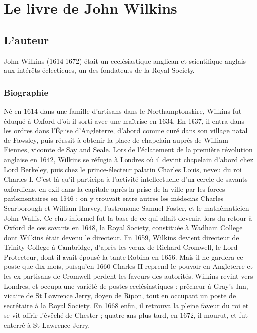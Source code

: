 \chapter{Le livre de John Wilkins}\label{Wilkins}
\section{L'auteur}\label{WilkinsAut}
John Wilkins (1614-1672) était un ecclésiastique anglican et scientifique anglais aux intérêts éclectiques, un des fondateurs de la Royal Society.
\subsection{Biographie}
Né en 1614 dans une famille d'artisans dans le Northamptonshire, Wilkins fut éduqué à Oxford d'où il sorti avec une maîtrise en 1634.
En 1637, il entra dans les ordres dans l'Église d'Angleterre, d'abord comme curé dans son village natal de Fawsley, puis réussit à obtenir la place de chapelain auprès de William Fiennes, vicomte de Say and Seale.
Lors de l'éclatement de la première révolution anglaise en 1642, Wilkins se réfugia à Londres où il devint chapelain d'abord chez Lord Berkeley, puis chez le prince-électeur palatin Charles Louis, neveu du roi Charles I\ier.
C'est là qu'il participa à l'activité intellectuelle d'un cercle de savants oxfordiens, en exil dans la capitale après la prise de la ville par les forces parlementaires en 1646 ; on y trouvait entre autres les médecins Charles Scarborough et William Harvey, l'astronome Samuel Foster, et le mathématicien John Wallis.
Ce club informel fut la base de ce qui allait devenir, lors du retour à Oxford de ces savants en 1648, la Royal Society, constituée à Wadham College dont Wilkins était devenu le directeur.
En 1659, Wilkins devient directeur de Trinity College à Cambridge, d'après les vœux de Richard Cromwell, le Lord Protecteur, dont il avait épousé la tante Robina en 1656.
Mais il ne gardera ce poste que dix mois, puisqu'en 1660 Charles II reprend le pouvoir en Angleterre et les ex-partisans de Cromwell perdent les faveurs des autorités.
Wilkins revint vers Londres, et occupa une variété de postes ecclésiastiques : prêcheur à Gray's Inn, vicaire de St Lawrence Jerry, doyen de Ripon, tout en occupant un poste de secrétaire à la Royal Society.
En 1668 enfin, il retrouva la pleine faveur du roi et se vit offrir l'évêché de Chester ; quatre ans plus tard, en 1672, il mourut, et fut enterré à St Lawrence Jerry.

